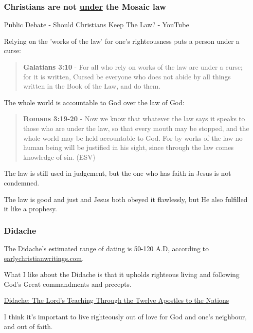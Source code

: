 \documentclass[11pt]{article}
\begin{document}
\subsubsection{Christians are not \underline{under} the Mosaic law}
\label{sec:orge206e0d}

\href{https://www.youtube.com/watch?v=CNHKqhwu6Bo}{Public Debate - Should Christians Keep The Law? - YouTube}

Relying on the 'works of the law' for one's righteousness puts a person under a curse:

\begin{quote}
\textbf{Galatians 3:10} - For all who rely on works of the law are under a curse; for it is written, Cursed be everyone who does not abide by all things written in the Book of the Law, and do them.
\end{quote}

The whole world is accountable to God over the law of God:

\begin{quote}
\textbf{Romans 3:19-20} - Now we know that whatever the law says it speaks to those who are under the law, so that every mouth may be stopped, and the whole world may be held accountable to God. For by works of the law no human being will be justified in his sight, since through the law comes knowledge of sin. (ESV)
\end{quote}

The law is still used in judgement, but the one who has faith in Jesus is not condemned.

The law is good and just and Jesus both obeyed it flawlessly, but He also fulfilled it like a prophesy.

\subsubsection{Didache}
\label{sec:orge0a5089}
The Didache's estimated range of dating is 50-120 A.D, according to \href{https://www.earlychristianwritings.com/text/didache-roberts.html}{earlychristianwritings.com}.

What I like about the Didache is that it upholds righteous living and following God's Great commandments and precepts.

\href{https://www.earlychristianwritings.com/text/didache-roberts.html}{Didache: The Lord's Teaching Through the Twelve Apostles to the Nations}

I think it's important to live righteously out of love for God and one's neighbour, and out of faith.
\end{document}
